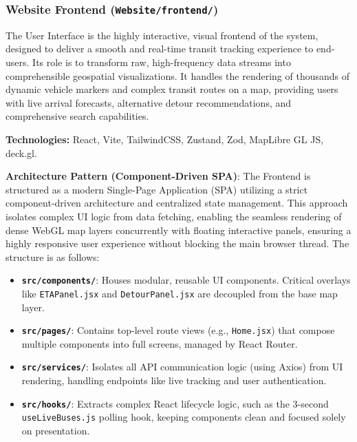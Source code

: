 \documentclass[a4paper]{article}
\begin{document}
\subsubsection{Website Frontend (\texttt{Website/frontend/})}
The User Interface is the highly interactive, visual frontend of the system, designed to deliver a smooth and real-time transit tracking experience to end-users. Its role is to transform raw, high-frequency data streams into comprehensible geospatial visualizations. It handles the rendering of thousands of dynamic vehicle markers and complex transit routes on a map, providing users with live arrival forecasts, alternative detour recommendations, and comprehensive search capabilities.

\textbf{Technologies:} React, Vite, TailwindCSS, Zustand, Zod, MapLibre GL JS, deck.gl.
\medskip

\textbf{Architecture Pattern (Component-Driven SPA)}: The Frontend is structured as a modern Single-Page Application (SPA) utilizing a strict component-driven architecture and centralized state management. This approach isolates complex UI logic from data fetching, enabling the seamless rendering of dense WebGL map layers concurrently with floating interactive panels, ensuring a highly responsive user experience without blocking the main browser thread. The structure is as follows:
\begin{itemize}
    \item \textbf{\texttt{src/components/}}: Houses modular, reusable UI components. Critical overlays like \texttt{ETAPanel.jsx} and \texttt{DetourPanel.jsx} are decoupled from the base map layer.
    \item \textbf{\texttt{src/pages/}}: Contains top-level route views (e.g., \texttt{Home.jsx}) that compose multiple components into full screens, managed by React Router.
    \item \textbf{\texttt{src/services/}}: Isolates all API communication logic (using Axios) from UI rendering, handling endpoints like live tracking and user authentication.
    \item \textbf{\texttt{src/hooks/}}: Extracts complex React lifecycle logic, such as the 3-second \texttt{useLiveBuses.js} polling hook, keeping components clean and focused solely on presentation.
\end{itemize}
\medskip
\end{document}
